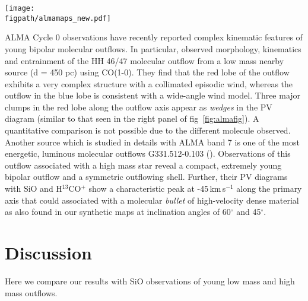\documentclass[useAMS,usenatbib]{mn2e}
\newcommand{\figpath}{/Users/bhargavvaidya/MyProject/work/Leeds_Uni/SiOJets_New/PAPER/PFIGS/}
\begin{document}
\begin{figure*}
 \texttt{[image: \\figpath/almamaps\_new.pdf]}%
 \caption{{\bf Left:} The integrated intensity map of SiO(2-1), (5-4)
   and (8-7). The emission map shows the 5-4 line intensity (in units
   of Jy$\,$kms$^{-1}$/beam), the blue contours show the J=8-7 line
   intensity and the green contours show the J=2-1 line intensity. The
   jet is inclined at an angle of 60$^{\circ}${\bf Right:} The PV
   diagram taken along the axis of the jet for the 5-4 line (in units
   of Jy/beam), showing the higher J transitions highlighting the
   knots of the jet and broad emission at the bow shock. 
   In both panels the ticks on the color bar represent the different contour levels.}
\label{fig:almafig}
\end{figure*} 

ALMA Cycle 0 observations have recently reported complex kinematic
features of young bipolar molecular outflows. In particular,
\cite{Arce:2013p14902} observed morphology, kinematics and entrainment 
of the HH 46/47 molecular outflow from a low mass nearby
source (d = 450 pc) using CO(1-0). They find that the red
lobe of the outflow exhibits a very complex structure with a
collimated episodic wind, whereas the outflow in the blue lobe is
consistent with a
wide-angle wind model. Three major clumps in the red lobe along the
outflow axis appear as {\em{wedges}} in the PV
diagram (similar to that seen in the right panel of fig~\ref{fig:almafig}). 
A quantitative comparison is not possible due to the different
molecule observed. Another source which is studied in details with ALMA band 7 is
one of the most energetic, luminous molecular outflows
G331.512-0.103 (\citealt{Merello:2013p15066}). Observations of this outflow
associated with a high mass star reveal a compact, extremely young
bipolar outflow and a symmetric outflowing shell. Further, their PV
diagrams with SiO and H$^{13}$CO$^{+}$ show a characteristic peak at
-45\,km\,s$^{-1}$ along the primary axis that could associated with a 
molecular {\em bullet} of high-velocity dense material as also found in our
synthetic maps at inclination angles of 60$^{\circ}$ and 45$^{\circ}$.

 
\section{Discussion}
\label{sec:discussion}
Here we compare our results with SiO observations of young low
mass and high mass outflows.
\end{document}
